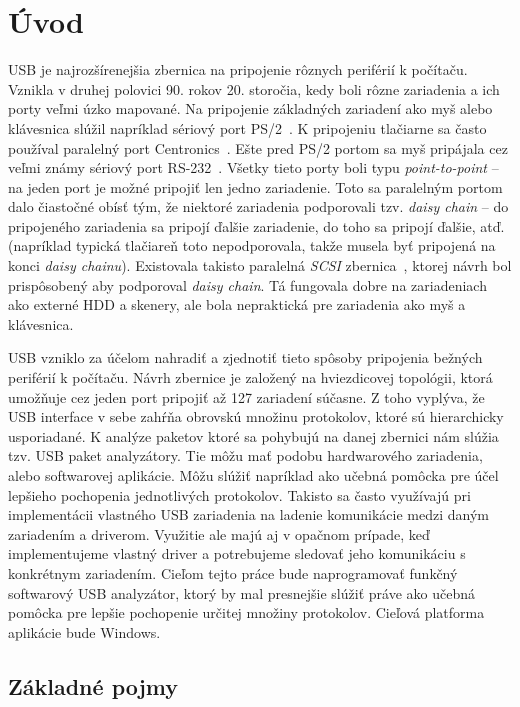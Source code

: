 \chapter{Úvod}

USB je najrozšírenejšia zbernica na pripojenie rôznych periférií k počítaču. Vznikla v druhej polovici 90. rokov 20. storočia, kedy boli rôzne zariadenia a ich porty veľmi úzko mapované. Na pripojenie základných zariadení ako myš alebo klávesnica slúžil napríklad sériový port PS/2~\cite{ps2_port}. K pripojeniu tlačiarne sa často používal paralelný port Centronics~\cite{parallel_port}. Ešte pred PS/2 portom sa myš pripájala cez veľmi známy sériový port RS-232~\cite{rs232_port}. Všetky tieto porty boli typu \textit{point-to-point} -- na jeden port je možné pripojiť len jedno zariadenie. Toto sa paralelným portom dalo čiastočné obísť tým, že niektoré zariadenia podporovali tzv. \textit{daisy chain} -- do pripojeného zariadenia sa pripojí ďalšie zariadenie, do toho sa pripojí ďalšie, atď. (napríklad typická tlačiareň toto nepodporovala, takže musela byť pripojená na konci \textit{daisy chainu}). Existovala takisto paralelná \textit{SCSI} zbernica~\cite{scsi_hub}, ktorej návrh bol prispôsobený aby podporoval  \textit{daisy chain}. Tá fungovala dobre na zariadeniach ako externé HDD a skenery, ale bola nepraktická pre zariadenia ako myš a klávesnica.

USB vzniklo za účelom nahradiť a zjednotiť tieto spôsoby pripojenia bežných periférií k počítaču. Návrh zbernice je založený na hviezdicovej topológii, ktorá umožňuje cez jeden port pripojiť až 127 zariadení súčasne. Z toho vyplýva, že USB interface v sebe zahŕňa obrovskú množinu protokolov, ktoré sú hierarchicky usporiadané. K analýze paketov ktoré sa pohybujú na danej zbernici nám slúžia tzv. USB paket analyzátory. Tie môžu mať podobu hardwarového zariadenia, alebo softwarovej aplikácie. Môžu slúžiť napríklad ako učebná pomôcka pre účel lepšieho pochopenia jednotlivých protokolov. Takisto sa často využívajú pri implementácii vlastného USB zariadenia na ladenie komunikácie medzi daným zariadením a driverom. Využitie ale majú aj v opačnom prípade, keď implementujeme vlastný driver a potrebujeme sledovať jeho komunikáciu s konkrétnym zariadením. Cieľom tejto práce bude naprogramovať funkčný softwarový USB analyzátor, ktorý by mal presnejšie slúžiť práve ako učebná pomôcka pre lepšie pochopenie určitej množiny protokolov. Cieľová platforma aplikácie bude Windows.

\section{Základné pojmy}

